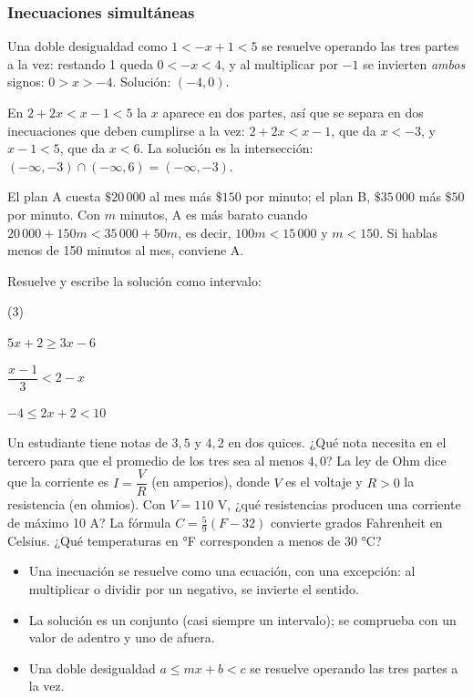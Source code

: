 \documentclass[11pt]{article}
\begin{document}
\subsubsection*{Inecuaciones simultáneas}

Una doble desigualdad como $1 < -x + 1 < 5$ se resuelve operando las tres partes a
la vez: restando 1 queda $0 < -x < 4$, y al multiplicar por $-1$ se invierten
\emph{ambos} signos: $0 > x > -4$. Solución: $(-4, 0)$.

\begin{ejemplo}
En $2 + 2x < x - 1 < 5$ la $x$ aparece en dos partes, así que se separa en dos
inecuaciones que deben cumplirse a la vez: $2 + 2x < x - 1$, que da $x < -3$, y
$x - 1 < 5$, que da $x < 6$. La solución es la intersección:
$(-\infty, -3) \cap (-\infty, 6) = (-\infty, -3)$.
\end{ejemplo}

\begin{aplicacion}
El plan A cuesta $\$20\,000$ al mes más $\$150$ por minuto; el plan B, $\$35\,000$
más $\$50$ por minuto. Con $m$ minutos, A es más barato cuando
$20\,000 + 150m < 35\,000 + 50m$, es decir, $100m < 15\,000$ y $m < 150$. Si hablas
menos de 150 minutos al mes, conviene A.
\end{aplicacion}

\begin{preguntas}
\pregunta Resuelve y escribe la solución como intervalo:
\begin{opciones*}(3)
  \item $5x + 2 \ge 3x - 6$
  \item $\dfrac{x - 1}{3} < 2 - x$
  \item $-4 \le 2x + 2 < 10$
\end{opciones*}
\espacio{4cm}
\pregunta Un estudiante tiene notas de $3{,}5$ y $4{,}2$ en dos quices. ¿Qué nota
necesita en el tercero para que el promedio de los tres sea al menos $4{,}0$?
\espacio{3cm}
\pregunta La ley de Ohm dice que la corriente es $I = \dfrac{V}{R}$ (en amperios),
donde $V$ es el voltaje y $R > 0$ la resistencia (en ohmios). Con $V = 110$ V,
¿qué resistencias producen una corriente de máximo 10 A?
\espacio{3cm}
\pregunta La fórmula $C = \frac{5}{9}(F - 32)$ convierte grados Fahrenheit en
Celsius. ¿Qué temperaturas en °F corresponden a menos de 30 °C?
\espacio{2.5cm}
\end{preguntas}

\begin{resumen}
\begin{itemize}
  \item Una inecuación se resuelve como una ecuación, con una excepción: al
        multiplicar o dividir por un negativo, se invierte el sentido.
  \item La solución es un conjunto (casi siempre un intervalo); se comprueba con
        un valor de adentro y uno de afuera.
  \item Una doble desigualdad $a \le mx + b < c$ se resuelve operando las tres partes a la vez.
\end{itemize}
\end{resumen}
\end{document}

